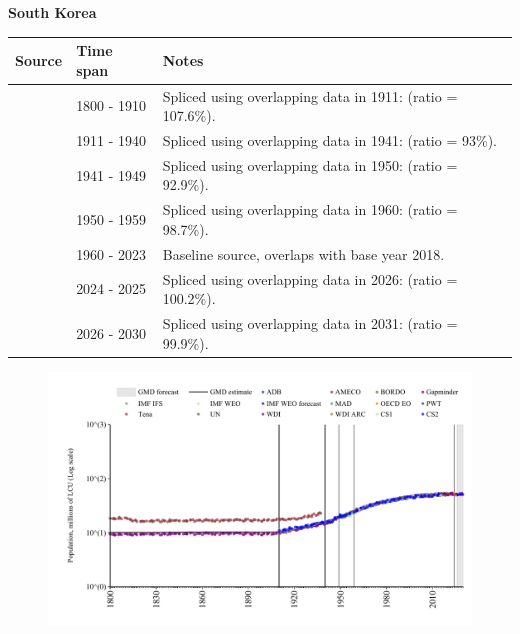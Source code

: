 \documentclass[12pt,a4paper,landscape]{article}
\begin{document}
\begin{adjustbox}{max totalsize={\paperwidth}{\paperheight},center}
\begin{minipage}[t][\textheight][t]{\textwidth}
\vspace*{0.5cm}
{}
\begin{center}
{\Large\bfseries South Korea}
\end{center}
\vspace{0.5cm}
\begin{table}[H]
\centering
\small
\begin{tabular}{|l|l|l|}
\hline
\textbf{Source} & \textbf{Time span} & \textbf{Notes} \\
\hline
\rowcolor{white}\cite{Gapminder}& 1800 - 1910 &Spliced using overlapping data in 1911: (ratio = 107.6\%).\\
\rowcolor{lightgray}\cite{CS1_KOR}& 1911 - 1940 &Spliced using overlapping data in 1941: (ratio = 93\%).\\
\rowcolor{white}\cite{CS2_KOR}& 1941 - 1949 &Spliced using overlapping data in 1950: (ratio = 92.9\%).\\
\rowcolor{lightgray}\cite{IMF_IFS}& 1950 - 1959 &Spliced using overlapping data in 1960: (ratio = 98.7\%).\\
\rowcolor{white}\cite{WDI}& 1960 - 2023 &Baseline source, overlaps with base year 2018.\\
\rowcolor{lightgray}\cite{OECD_EO}& 2024 - 2025 &Spliced using overlapping data in 2026: (ratio = 100.2\%).\\
\rowcolor{white}\cite{Gapminder}& 2026 - 2030 &Spliced using overlapping data in 2031: (ratio = 99.9\%).\\
\hline
\end{tabular}
\end{table}
\begin{figure}[H]
\centering
\includegraphics[width=\textwidth,height=0.6\textheight,keepaspectratio]{graphs/KOR_pop.pdf}
\end{figure}
\end{minipage}
\end{adjustbox}
\end{document}
